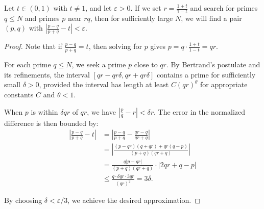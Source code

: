 \documentclass[10pt,a4paper]{amsart}
\begin{document}
\begin{lemma}\label{lem:targeted}
Let $t \in (0,1)$ with $t \neq 1$, and let $\varepsilon > 0$. If we set $r = \frac{1+t}{1-t}$ and search for primes $q \leq N$ and primes $p$ near $rq$, then for sufficiently large $N$, we will find a pair $(p,q)$ with $\left|\frac{p-q}{p+q} - t\right| < \varepsilon$.
\end{lemma}

\begin{proof}
Note that if $\frac{p-q}{p+q} = t$, then solving for $p$ gives $p = q \cdot \frac{1+t}{1-t} = qr$.

For each prime $q \leq N$, we seek a prime $p$ close to $qr$. By Bertrand's postulate and its refinements, the interval $[qr - qr\delta, qr + qr\delta]$ contains a prime for sufficiently small $\delta > 0$, provided the interval has length at least $C(qr)^{\theta}$ for appropriate constants $C$ and $\theta < 1$.

When $p$ is within $\delta qr$ of $qr$, we have $\left|\frac{p}{q} - r\right| < \delta r$. The error in the normalized difference is then bounded by:
\begin{align}
\left|\frac{p-q}{p+q} - t\right| &= \left|\frac{p-q}{p+q} - \frac{qr-q}{qr+q}\right|\\
&= \left|\frac{(p-qr)(q+qr) + qr(q-p)}{(p+q)(qr+q)}\right|\\
&= \frac{q|p-qr|}{(p+q)(qr+q)} \cdot |2qr + q - p|\\
&\leq \frac{q \cdot \delta qr \cdot 3qr}{(qr)^2} = 3\delta.
\end{align}

By choosing $\delta < \varepsilon/3$, we achieve the desired approximation.
\end{proof}
\end{document}
